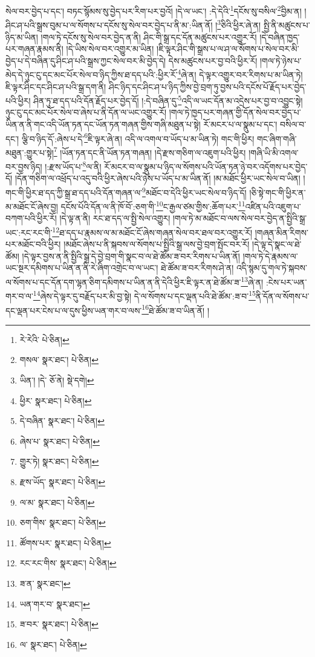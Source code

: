 སེལ་བར་བྱེད་པ་དང་། བཏང་སྙོམས་སུ་བྱེད་པར་རིག་པར་བྱའོ། །དེ་ལ་ཡང་། :དེ་དེའི་\footnote{རེ་རེའི་  པེ་ཅིན། }དངོས་སུ་བསིལ་\footnote{གསལ་  སྣར་ཐང་།  པེ་ཅིན། }བྱིམ་ན། །ཤིང་ཤ་པའི་སྒྲས་བུམ་པ་ལ་སོགས་པ་དངོས་སུ་སེལ་བར་བྱེད་པ་ནི་མ་:ཡིན་ནོ། །\footnote{ཡིན་། །དེ་  ཅོ་ནེ།  སྡེ་དགེ། }ཅིའི་ཕྱིར་ཞེ་ན། སྤྱི་ནི་མཚུངས་པ་ཉིད་མ་ཡིན། །གལ་ཏེ་དངོས་སུ་སེལ་བར་བྱེད་ན་ནི། ཤིང་གི་སྒྲ་དང་དོན་མཚུངས་པར་འགྱུར་རོ། །དེ་བཞིན་ཁྱད་པར་གཞན་རྣམས་ནི། །དེ་ཡིས་སེལ་བར་འགྱུར་མ་ཡིན། །ཇི་ལྟར་ཤིང་གི་སྒྲས་པ་ལ་ཤ་ལ་སོགས་པ་སེལ་བར་མི་བྱེད་པ་དེ་བཞིན་དུ་ཤིང་ཤ་པའི་སྒྲས་ཀྱང་སེལ་བར་མི་བྱེད་དེ། དེས་མཚུངས་པར་བྱ་བའི་ཕྱིར་རོ། །གལ་ཏེ་ཉེས་པ་མེད་དེ་ཉུང་ངུ་དང་མང་པོར་སེལ་བ་ཉིད་ཀྱིས་ཐ་དད་པའི་:ཕྱིར་རོ་\footnote{ཕྱིར་  སྣར་ཐང་།  པེ་ཅིན། }ཞེ་ན། དེ་ལྟར་འགྱུར་བར་རིགས་པ་མ་ཡིན་ཏེ། ཇི་ལྟར་ཤིང་དང་ཤིང་ཤ་པའི་སྒྲ་དག་ནི། ཤིང་ཉིད་དང་ཤིང་ཤ་པ་ཉིད་ཀྱིས་བྱེ་བྲག་ཏུ་བྱས་པའི་དངོས་པོ་རྗོད་པར་བྱེད་པའི་ཕྱིར། ཤིན་ཏུ་ཐ་དད་པའི་དོན་རྗོད་པར་བྱེད་དོ། །:དེ་བཞིན་དུ་\footnote{དེ་བཞིན་  སྣར་ཐང་།  པེ་ཅིན། }འདི་ལ་ཡང་དོན་མ་འདྲེས་པར་བྱ་བ་འབྱུང་སྟེ། ཉུང་ངུ་དང་མང་པོར་སེལ་བ་ཞེས་པ་ནི་དོན་ལ་ཡང་འགྱུར་རོ། །གལ་ཏེ་ཁྱད་པར་གཞན་གྱི་དོན་སེལ་བར་བྱེད་པ་ཡིན་ན་ནི་གང་འདི་ཡོན་ཏན་དང་ཡོན་ཏན་གཞན་གྱིས་གཞི་མཐུན་པ་སྟེ། རོ་མངར་པ་ལ་སྣུམ་པ་དང་། བསིལ་བ་དང་། ལྕི་བ་ཉིད་དོ་:ཞེས་པ་དེ་\footnote{ཞེས་པ་  སྣར་ཐང་།  པེ་ཅིན། }ཇི་ལྟར་ཞེ་ན། འདི་ལ་འགལ་བ་ཡོད་པ་མ་ཡིན་ཏེ། གང་གི་ཕྱིར། གང་ཞིག་གཞི་མཐུན་:གྱུར་པ་སྟེ།\footnote{གྱུར་ཏེ།  སྣར་ཐང་།  པེ་ཅིན། } །ཡོན་ཏན་དང་ནི་ཡོན་ཏན་གཞན། །དེ་རྫས་གཅིག་ལ་འཇུག་པའི་ཕྱིར། །གཞི་ཡི་མི་འགལ་བར་བྱས་ཉིད། །:རྫས་ཡོད་པ་\footnote{རྫས་ཡོད་  སྣར་ཐང་།  པེ་ཅིན། }ལ་ནི། རོ་མངར་བ་ལ་སྣུམ་པ་ཉིད་ལ་སོགས་པའི་ཡོན་ཏན་ཉེ་བར་འདོགས་པར་བྱེད་དོ། །དོན་གཅིག་ལ་འཕྲོད་པ་འདུ་བའི་ཕྱིར་ཞེས་པའི་ཉེས་པ་ཡོད་པ་མ་ཡིན་ནོ། །མ་མཐོང་ཕྱིར་ཡང་སེལ་བ་ཡིན། །གང་གི་ཕྱིར་ཐ་དད་ཀྱི་སྒྲ་ཐ་དད་པའི་དོན་གཞན་ལ་\footnote{ལ་མ་  སྣར་ཐང་།  པེ་ཅིན། }མཐོང་བ་དེའི་ཕྱིར་ཡང་སེལ་བ་ཉིད་དོ། །ཅི་སྟེ་གང་གི་ཕྱིར་ན་མ་མཐོང་ངོ་ཞེས་བྱ། དངོས་པོའི་དོན་ལ་ནི་ཁོ་བོ་:ཅག་གི་\footnote{ཅག་གིས་  སྣར་ཐང་།  པེ་ཅིན། }ང་རྒྱལ་ཙམ་གྱིས་:ཆོག་པར་\footnote{ཚོགས་པར་  སྣར་ཐང་།  པེ་ཅིན། }འཛིན་པའི་འཇུག་པ་བཀག་པའི་ཕྱིར་རོ། །དེ་ལྟ་ན་ནི། རང་ཐ་དད་ལ་སྤྱི་སེལ་འགྱུར། །གལ་ཏེ་མ་མཐོང་བ་ལས་སེལ་བར་བྱེད་ན་སྤྱིའི་སྒྲ་ཡང་:རང་རང་གི་\footnote{རང་རང་གིས་  སྣར་ཐང་།  པེ་ཅིན། }ཐ་དད་པ་རྣམས་ལ་མ་མཐོང་ངོ་ཞེས་གཞན་སེལ་བར་ཐལ་བར་འགྱུར་རོ། །གཞན་མིན་རིགས་པར་མཐོང་བའི་ཕྱིར། །མཐོང་ཞེས་པ་ནི་སྐབས་ལ་སོགས་པ་སྤྱིའི་སྒྲ་ལས་བྱེ་བྲག་སྤོང་བར་རོ། །དེ་ལྟ་དེ་སྣང་ལ་ཐེ་ཚོམ། །དེ་ལྟར་བྱས་ན་ནི་སྤྱིའི་སྒྲ་དེ་བྱེ་བྲག་གི་སྣང་བ་ལ་ཐེ་ཚོམ་ཟ་བར་རིགས་པ་ཡིན་ནོ། །གལ་ཏེ་དེ་རྣམས་ལ་ཡང་སྔར་དམིགས་པ་ཡིན་ན་ནི་རེ་ཞིག་འགྲེང་བ་ལ་ཡང་། ཐེ་ཚོམ་ཟ་བར་རིགས་ཤེ་ན། འདི་སྙམ་དུ་གལ་ཏེ་སྐབས་ལ་སོགས་པ་དང་དོན་དག་ལྷན་ཅིག་དམིགས་པ་ཡིན་ན་ནི་དེའི་ཕྱིར་ཇི་ལྟར་ན་ཐེ་ཚོམ་ཟ་\footnote{ཟ་ན་  སྣར་ཐང་། }ཞེ་ན། :ངེས་པར་ཡན་གར་བ་ལ་\footnote{ཡན་གར་བ་  སྣར་ཐང་། }ཞེས་དེ་ལྟར་དུ་བརྗོད་པར་མི་བྱ་སྟེ། དེ་ལ་སོགས་པ་དང་ལྡན་པའི་ཐེ་ཚོམ་:ཟ་བ་\footnote{ཟ་བར་  སྣར་ཐང་།  པེ་ཅིན། }ནི་དོན་ལ་སོགས་པ་དང་ལྡན་པར་ངེས་པ་ལ་དུས་ཕྱིས་ཡན་གར་བ་ལས་\footnote{ལ་  སྣར་ཐང་།  པེ་ཅིན། }ཐེ་ཚོམ་ཟ་བ་ཡིན་ནོ། །
